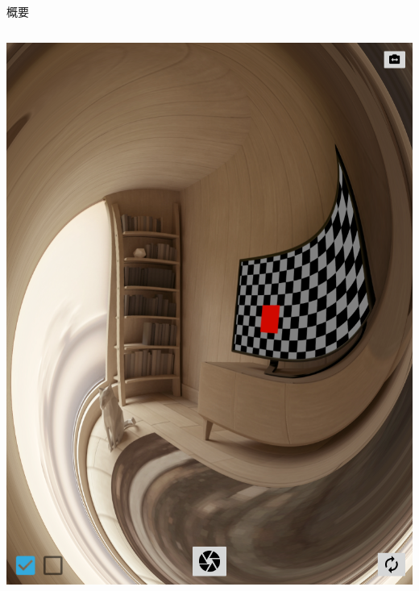\documentclass[dvipdfmx,12pt]{beamer}
\begin{document}
\begin{frame}{概要}
\begin{columns}[c]
\begin{column}{0.4\linewidth}
\begin{center}
        \includegraphics[width=\linewidth]{fig/screenshot.png}
      \end{center}
    \end{column}
  \end{columns}
\end{frame}
\end{document}

